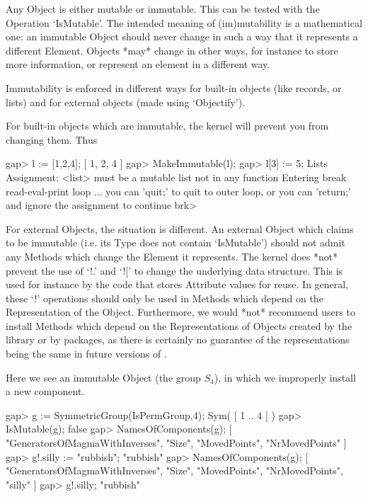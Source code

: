 
Any {\GAP} Object is either mutable or immutable. This can be tested
with the Operation `IsMutable'. The intended meaning of (im)mutability
is a mathematical one:  an immutable Object should never change in
such a way that it represents a different Element. Objects *may*
change in other ways, for instance to store more information, or
represent an element in a different way.

Immutability is enforced in different ways for built-in objects (like
records, or lists) and for external objects (made using `Objectify').

For built-in objects which are immutable, the kernel will prevent
you from changing them. Thus

\beginexample
gap> l := [1,2,4];
[ 1, 2, 4 ]
gap> MakeImmutable(l);
gap> l[3] := 5;
Lists Assignment: <list> must be a mutable list
not in any function
Entering break read-eval-print loop ...
you can 'quit;' to quit to outer loop, or
you can 'return;' and ignore the assignment to continue
brk> 
\endexample

For external Objects, the situation is different. An external Object which
claims to be immutable (i.e. its Type does not contain `IsMutable')
should not admit any Methods which change the Element it represents.
The kernel does *not* prevent the use of `!.' and `![' to change the
underlying data structure.
This is used for instance by the code that stores Attribute values for reuse.
In general, these `!' operations should only be used in Methods
which depend on the Representation of the Object. Furthermore, we would *not*
recommend users to install Methods which depend on the Representations of
Objects created by the library or by {\GAP} packages, as there is certainly no
guarantee of the representations being the same in future versions of {\GAP}.

Here we see an immutable Object (the group $S_4$), in which we improperly
install a new component.

\beginexample
gap> g := SymmetricGroup(IsPermGroup,4);
Sym( [ 1 .. 4 ] )
gap> IsMutable(g);
false
gap> NamesOfComponents(g);
[ "GeneratorsOfMagmaWithInverses", "Size", "MovedPoints", "NrMovedPoints" ]
gap> g!.silly := "rubbish";
"rubbish"
gap> NamesOfComponents(g);
[ "GeneratorsOfMagmaWithInverses", "Size", "MovedPoints", "NrMovedPoints", 
  "silly" ]
gap> g!.silly;
"rubbish"
\endexample

